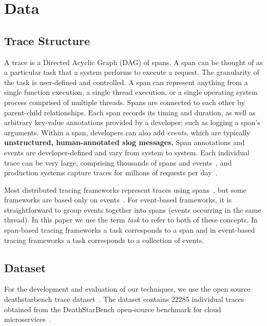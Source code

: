 \section{Data}
\label{sec:data}

\subsection{Trace Structure}

A trace is a Directed Acyclic Graph (DAG) of spans. A span can be thought
of as a particular task that a system performs to execute a request. The granularity of the task
is user-defined and controlled. A span can represent anything from a single function execution, 
a single thread execution, or a single operating system process comprised of multiple threads.
Spans are connected to each other by parent-child relationships. 
Each span records its timing and duration, as well as arbitrary key-value annotations provided by a developer: such as logging a span's arguments.
Within a span, developers can also add \emph{events}, which are typically \textbf{unstructured, human-annotated slog messages.}
Span annotations and events are developer-defined and vary from system to system.
Each individual trace can be very large, comprising thousands of spans and events~\cite{kaldor2017canopy, las2019sifter, shkurographdiffviz}, and production systems capture traces for millions of requests per day~\cite{kaldor2017canopy}.

Most distributed tracing frameworks represent traces using spans~\cite{jaeger,opentelemetry,sigelman2010dapper}, but some frameworks are based only on events~\cite{fonseca2007xtrace}.  
For event-based frameworks, it is straightforward to group events together into spans (\eg events occurring in the same thread). 
In this paper we use the term \emph{task} to refer to both of these concepts. In span-based tracing frameworks a task corresponds to a span and in event-based tracing
frameworks a task corresponds to a collection of events.

\subsection{Dataset}

For the development and evaluation of our techniques, we use the open source deathstarbench trace dataset~\cite{anand2019deathstarbenchtraces}.
The dataset contains 22285 individual traces obtained from the DeathStarBench open-source benchmark for cloud microservices~\cite{gan2019deathstar}.
